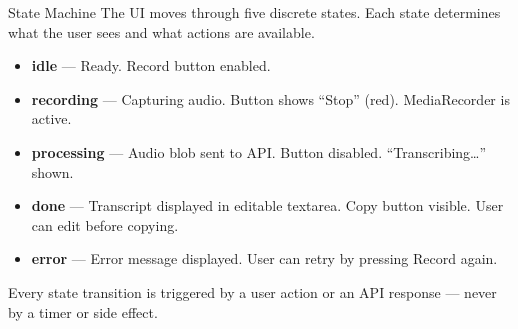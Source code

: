\documentclass{beamer}
\begin{document}
\begin{frame}{State Machine}
    The UI moves through five discrete states. Each state determines
    what the user sees and what actions are available.

    \vspace{0.6em}
    \begin{itemize}
        \item \textbf{idle} --- Ready. Record button enabled.
        \item \textbf{recording} --- Capturing audio. Button shows ``Stop'' (red).
              MediaRecorder is active.
        \item \textbf{processing} --- Audio blob sent to API. Button disabled.
              ``Transcribing\ldots'' shown.
        \item \textbf{done} --- Transcript displayed in editable textarea.
              Copy button visible. User can edit before copying.
        \item \textbf{error} --- Error message displayed. User can retry
              by pressing Record again.
    \end{itemize}

    \vspace{0.4em}
    Every state transition is triggered by a user action or an
    API response --- never by a timer or side effect.
\end{frame}
\end{document}
